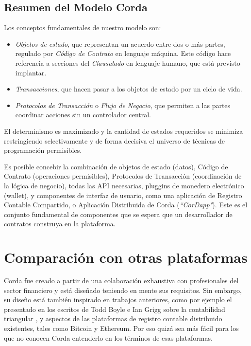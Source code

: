 \documentclass{article}
\begin{document}
\subsection{Resumen del Modelo Corda}
Los conceptos fundamentales de nuestro modelo son:
\begin{itemize}

\item \textit{Objetos de estado}, que representan un acuerdo entre dos o más partes, regulado por \textit{Código de Contrato} en lenguaje máquina. Este código hace referencia a secciones del \textit{Clausulado} en lenguaje humano, que está previsto implantar. \item \textit{Transacciones}, que hacen pasar a los objetos de estado por un ciclo de vida.
\item \textit{Protocolos de Transacción} o \textit{Flujo de Negocio}, que permiten a las partes coordinar acciones sin un controlador central.
\end{itemize}

El determinismo es maximizado y la cantidad de estados requeridos se minimiza restringiendo selectivamente y de forma decisiva el universo de técnicas de programación permisibles.

Es posible concebir la combinación de objetos de estado (datos), Código de Contrato (operaciones permisibles), Protocolos de Transacción (coordinación de la lógica de negocio), todas las API necesarias, pluggins de monedero electrónico (wallet), y componentes de interfaz de usuario, como una aplicación de Registro Contable Compartido, o Aplicación Distribuida de Corda (\textit{``CorDapp"}). Este es el conjunto fundamental de componentes que se espera que un desarrollador de contratos construya en la plataforma. 



\section{Comparación con otras plataformas}
Corda fue creado a partir de una colaboración exhaustiva con profesionales del sector financiero y está diseñado teniendo en mente sus requisitos. Sin embargo, su diseño está también inspirado en trabajos anteriores, como por ejemplo el presentado en los escritos de Todd Boyle e Ian Grigg sobre la contabilidad triangular \cite{Triple}, y aspectos de las plataformas de registro contable distribuido existentes, tales como Bitcoin\cite{Bitcoin} y Ethereum. Por eso quizá sea más fácil para los que no conocen Corda entenderlo en los términos de esas plataformas. 
\end{document}
